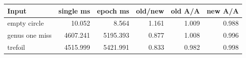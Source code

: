 \begin{center}
\small
\begin{tabular}{lrrrrr}
\toprule
Input & single ms & epoch ms & old/new & old A/A & new A/A\\
\midrule
empty circle & 10.052 & 8.564 & 1.161 & 1.009 & 0.988\\
genus one miss & 4607.241 & 5195.393 & 0.877 & 1.008 & 0.996\\
trefoil & 4515.999 & 5421.991 & 0.833 & 0.982 & 0.998\\
\bottomrule
\end{tabular}
\end{center}
